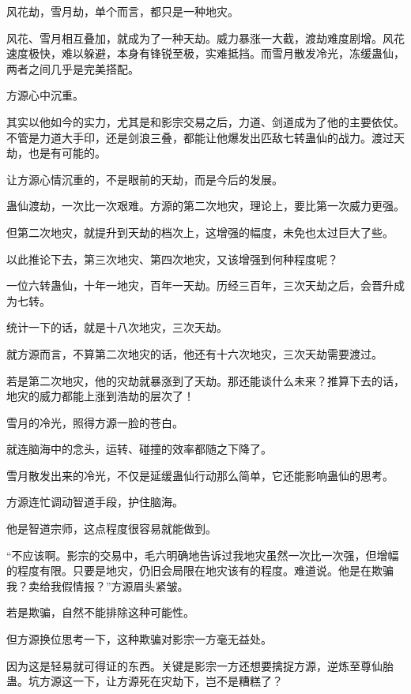 
\begin{this_body}



风花劫，雪月劫，单个而言，都只是一种地灾。

风花、雪月相互叠加，就成为了一种天劫。威力暴涨一大截，渡劫难度剧增。风花速度极快，难以躲避，本身有锋锐至极，实难抵挡。而雪月散发冷光，冻缓蛊仙，两者之间几乎是完美搭配。

方源心中沉重。

其实以他如今的实力，尤其是和影宗交易之后，力道、剑道成为了他的主要依仗。不管是力道大手印，还是剑浪三叠，都能让他爆发出匹敌七转蛊仙的战力。渡过天劫，也是有可能的。

让方源心情沉重的，不是眼前的天劫，而是今后的发展。

蛊仙渡劫，一次比一次艰难。方源的第二次地灾，理论上，要比第一次威力更强。

但第二次地灾，就提升到天劫的档次上，这增强的幅度，未免也太过巨大了些。

以此推论下去，第三次地灾、第四次地灾，又该增强到何种程度呢？

一位六转蛊仙，十年一地灾，百年一天劫。历经三百年，三次天劫之后，会晋升成为七转。

统计一下的话，就是十八次地灾，三次天劫。

就方源而言，不算第二次地灾的话，他还有十六次地灾，三次天劫需要渡过。

若是第二次地灾，他的灾劫就暴涨到了天劫。那还能谈什么未来？推算下去的话，地灾的威力都能上涨到浩劫的层次了！

雪月的冷光，照得方源一脸的苍白。

就连脑海中的念头，运转、碰撞的效率都随之下降了。

雪月散发出来的冷光，不仅是延缓蛊仙行动那么简单，它还能影响蛊仙的思考。

方源连忙调动智道手段，护住脑海。

他是智道宗师，这点程度很容易就能做到。

“不应该啊。影宗的交易中，毛六明确地告诉过我地灾虽然一次比一次强，但增幅的程度有限。只要是地灾，仍旧会局限在地灾该有的程度。难道说。他是在欺骗我？卖给我假情报？”方源眉头紧皱。

若是欺骗，自然不能排除这种可能性。

但方源换位思考一下，这种欺骗对影宗一方毫无益处。

因为这是轻易就可得证的东西。关键是影宗一方还想要擒捉方源，逆炼至尊仙胎蛊。坑方源这一下，让方源死在灾劫下，岂不是糟糕了？


\end{this_body}
